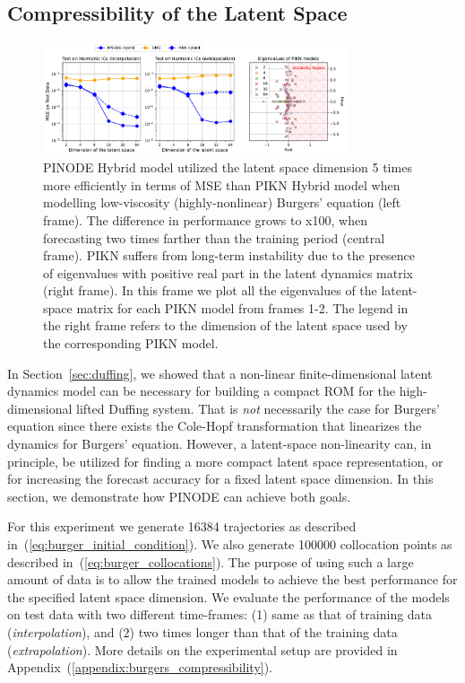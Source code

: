 \subsection{Compressibility of the Latent Space}


\label{sec:compressibility}
\begin{figure}[t]
    \centering
    \includegraphics[width=0.8\textwidth]{figures/compressibility.pdf}
    \caption{PINODE Hybrid model utilized the latent space dimension 5 times more efficiently in terms of MSE than PIKN Hybrid model when modelling low-viscosity (highly-nonlinear) Burgers' equation (left frame). The difference in performance grows to x100, when forecasting two times farther than the training period (central frame). PIKN suffers from long-term instability due to the presence of eigenvalues with positive real part in the latent dynamics matrix (right frame). In this frame we plot all the eigenvalues of the latent-space matrix for each PIKN model from frames 1-2. The legend in the right frame refers to the dimension of the latent space used by the corresponding PIKN model.}
    \label{fig:burgers_compressibility}
\end{figure}

In Section~\ref{sec:duffing}, we showed that a non-linear finite-dimensional latent dynamics model can be necessary for building a compact ROM for the high-dimensional lifted Duffing system. That is \textit{not} necessarily the case for Burgers' equation since there exists the Cole-Hopf transformation that linearizes the dynamics for Burgers' equation. However, a latent-space non-linearity can, in principle, be utilized for finding a more compact latent space representation, or for increasing the forecast accuracy for a fixed latent space dimension. In this section, we demonstrate how PINODE can achieve both goals. 

For this experiment we generate 16384 trajectories as described in~(\ref{eq:burger_initial_condition}). We also generate 100000 collocation points as described in~(\ref{eq:burger_collocations}). The purpose of using such a large amount of data is to allow the trained models to achieve the best performance for the specified latent space dimension. We evaluate the performance of the models on test data with two different time-frames: (1) same as that of training data (\textit{interpolation}), and (2) two times longer than that of the training data (\textit{extrapolation}). More details on the experimental setup are provided in Appendix~(\ref{appendix:burgers_compressibility}).

